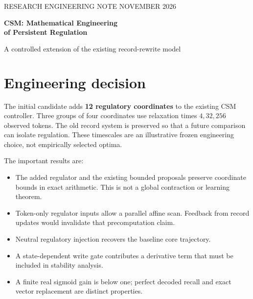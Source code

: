 \documentclass[11pt,a4paper]{article}
\begin{document}
\begin{center}
{\small\color{accent}RESEARCH ENGINEERING NOTE  NOVEMBER 2026}\par
\vspace{5mm}
{\LARGE\bfseries\color{ink}CSM: Mathematical Engineering\\of Persistent Regulation}\par
\vspace{3mm}
{\large A controlled extension of the existing record-rewrite model}
\end{center}

\begin{abstract}
We specify a small, causal regulatory extension of the existing Compositional
State Model (CSM). A token-derived bank of exponential traces influences the
existing controller; record semantics, operations, links, readout and cursor
updates remain unchanged. The trace bank has a compact associative scan, but the
complete CSM retains its sequential record/controller dependency. We derive
boundedness, forgetting, routing-margin and conditional local-stability results;
identify precise limits of sigmoid overwriting and state-dependent gates; and
give parameter, arithmetic and memory accounting. A NumPy reference, exact
rational checks, smooth-subgraph gradient checks and Lean structural proofs
accompany this specification. No model was trained and no speed or quality gain
is established.
\end{abstract}

\section*{Engineering decision}
The initial candidate adds \textbf{12 regulatory coordinates} to the existing
CSM controller. Three groups of four coordinates use relaxation times
\(4,32,256\) observed tokens. The old record system is preserved so that a future
comparison can isolate regulation. These timescales are an illustrative frozen
engineering choice, not empirically selected optima.

The important results are:
\begin{itemize}
\item The added regulator and the existing bounded proposals preserve coordinate
bounds in exact arithmetic. This is not a global contraction or learning theorem.
\item Token-only regulator inputs allow a parallel affine scan. Feedback from
record updates would invalidate that precomputation claim.
\item Neutral regulatory injection recovers the baseline core trajectory.
\item A state-dependent write gate contributes a derivative term that must be
included in stability analysis.
\item A finite real sigmoid gain is below one; perfect decoded recall and exact
vector replacement are distinct properties.
\end{itemize}
\end{document}
